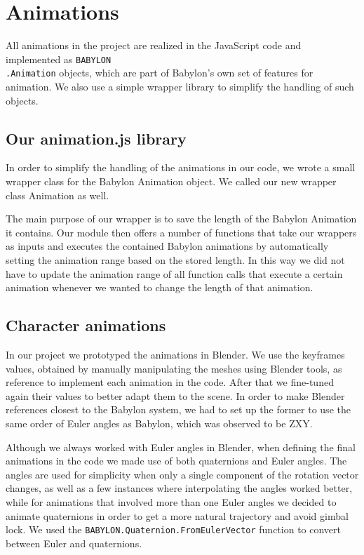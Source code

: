 
\chapter{Animations}

All animations in the project are realized in the JavaScript code and implemented as \texttt{BABYLON\\.Animation} objects, which are part of Babylon's own set of features for animation. We also use a simple wrapper library to simplify the handling of such objects.

\section{Our animation.js library}

In order to simplify the handling of the animations in our code, we wrote a small wrapper class for the Babylon Animation object. We called our new wrapper class Animation as well.

The main purpose of our wrapper is to save the length of the Babylon Animation it contains. Our module then offers a number of functions that take our wrappers as inputs and executes the contained Babylon animations by automatically setting the animation range based on the stored length. In this way we did not have to update the animation range of all function calls that execute a certain animation whenever we wanted to change the length of that animation.


\section{Character animations}

In our project we prototyped the animations in Blender. We use the keyframes values, obtained by manually manipulating the meshes using Blender tools, as reference to implement each animation in the code. After that we fine-tuned again their values to better adapt them to the scene. In order to make Blender references closest to the Babylon system, we had to set up the former to use the same order of Euler angles as Babylon, which was observed to be ZXY.

Although we always worked with Euler angles in Blender, when defining the final animations in the code we made use of both quaternions and Euler angles. The angles are used for simplicity when only a single component of the rotation vector changes, as well as a few instances where interpolating the angles worked better, while for animations that involved more than one Euler angles we decided to animate quaternions in order to get a more natural trajectory and avoid gimbal lock. We used the \texttt{BABYLON.Quaternion.FromEulerVector} function to convert between Euler and quaternions.

